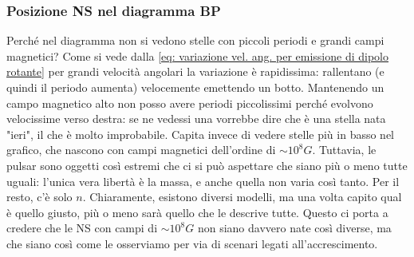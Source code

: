 \subsubsection{Posizione NS nel diagramma BP}
Perché nel diagramma non si vedono stelle con piccoli periodi e grandi campi magnetici?
Come si vede dalla \eqref{eq: variazione vel. ang. per emissione di dipolo rotante} per grandi velocità angolari la variazione è rapidissima: rallentano (e quindi il periodo aumenta) velocemente emettendo un botto.
Mantenendo un campo magnetico alto non posso avere periodi piccolissimi perché evolvono velocissime verso destra: se ne vedessi una vorrebbe dire che è una stella nata "ieri", il che è molto improbabile.
Capita invece di vedere stelle più in basso nel grafico, che nascono con campi magnetici dell'ordine di $\sim 10^8G$.
Tuttavia, le pulsar sono oggetti così estremi che ci si può aspettare che siano più o meno tutte uguali: l'unica vera libertà è la massa, e anche quella non varia così tanto.
Per il resto, c'è solo $n$.
Chiaramente, esistono diversi modelli, ma una volta capito qual è quello giusto, più o meno sarà quello che le descrive tutte.
Questo ci porta a credere che le NS con campi di $\sim10^8G$ non siano davvero nate così diverse, ma che siano così come le osserviamo per via di scenari legati all'accrescimento.

